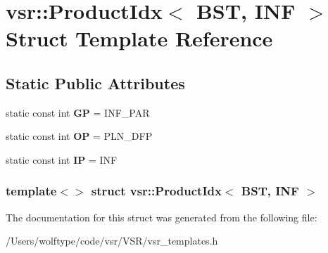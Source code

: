\hypertarget{structvsr_1_1_product_idx_3_01_b_s_t_00_01_i_n_f_01_4}{\section{vsr\-:\-:Product\-Idx$<$ B\-S\-T, I\-N\-F $>$ Struct Template Reference}
\label{structvsr_1_1_product_idx_3_01_b_s_t_00_01_i_n_f_01_4}
}
\subsection*{Static Public Attributes}
\begin{DoxyCompactItemize}
\item 
\hypertarget{structvsr_1_1_product_idx_3_01_b_s_t_00_01_i_n_f_01_4_ae2e659d326738c5bf60cfbb1e5f8f74d}{static const int {\bfseries G\-P} = I\-N\-F\-\_\-\-P\-A\-R}\label{structvsr_1_1_product_idx_3_01_b_s_t_00_01_i_n_f_01_4_ae2e659d326738c5bf60cfbb1e5f8f74d}

\item 
\hypertarget{structvsr_1_1_product_idx_3_01_b_s_t_00_01_i_n_f_01_4_ae682392fd8e3a50b48ae61698f2702dc}{static const int {\bfseries O\-P} = P\-L\-N\-\_\-\-D\-F\-P}\label{structvsr_1_1_product_idx_3_01_b_s_t_00_01_i_n_f_01_4_ae682392fd8e3a50b48ae61698f2702dc}

\item 
\hypertarget{structvsr_1_1_product_idx_3_01_b_s_t_00_01_i_n_f_01_4_a2f776f3c3b6f1bb81a231fc674ec4b0a}{static const int {\bfseries I\-P} = I\-N\-F}\label{structvsr_1_1_product_idx_3_01_b_s_t_00_01_i_n_f_01_4_a2f776f3c3b6f1bb81a231fc674ec4b0a}

\end{DoxyCompactItemize}
\subsubsection*{template$<$$>$ struct vsr\-::\-Product\-Idx$<$ B\-S\-T, I\-N\-F $>$}



The documentation for this struct was generated from the following file\-:\begin{DoxyCompactItemize}
\item 
/\-Users/wolftype/code/vsr/\-V\-S\-R/vsr\-\_\-templates.\-h\end{DoxyCompactItemize}
